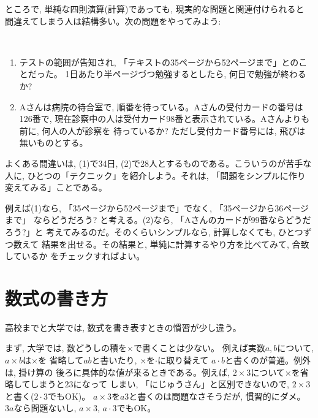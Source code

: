 
ところで, 単純な四則演算(計算)であっても, 現実的な問題と関連付けられると
間違えてしまう人は結構多い。次の問題をやってみよう:

\begin{q}　
\begin{enumerate} 
\item テストの範囲が告知され, 「テキストの35ページから52ページまで」とのことだった。
1日あたり半ページづつ勉強するとしたら, 何日で勉強が終わるか?
\item Aさんは病院の待合室で, 順番を待っている。Aさんの受付カードの番号は126番で, 
現在診察中の人は受付カード98番と表示されている。Aさんよりも前に, 何人の人が診察を
待っているか? ただし受付カード番号には, 飛びは無いものとする。
\end{enumerate}
\end{q}
よくある間違いは, (1)で34日, (2)で28人とするものである。こういうのが苦手な人に, 
ひとつの「テクニック」を紹介しよう。それは, 「問題をシンプルに作り変えてみる」ことである。

例えば(1)なら, 「35ページから52ページまで」でなく, 「35ページから36ページまで」
ならどうだろう? と考える。(2)なら, 「Aさんのカードが99番ならどうだろう?」と
考えてみるのだ。そのくらいシンプルなら, 計算しなくても, ひとつずつ数えて
結果を出せる。その結果と, 単純に計算するやり方を比べてみて, 合致しているか
をチェックすればよい。\\


\section{数式の書き方}

高校までと大学では, 数式を書き表すときの慣習が少し違う。

まず, 大学では, 数どうしの積を$\times$で書くことは少ない。
例えば実数$a, b$について, $a\times b$は$\times$を
省略して$ab$と書いたり, $\times$を$\cdot$に取り替えて
$a\cdot b$と書くのが普通。例外は, 掛け算の
後ろに具体的な値が来るときである。例えば, 
$2\times3$について$\times$を省略してしまうと$23$になって
しまい, 「にじゅうさん」と区別できないので, 
$2\times3$と書く($2\cdot 3$でもOK)。
$a\times3$を$a3$と書くのは問題なさそうだが, 慣習的にダメ。
$3a$なら問題ないし, $a\times3$, $a\cdot 3$でもOK。

